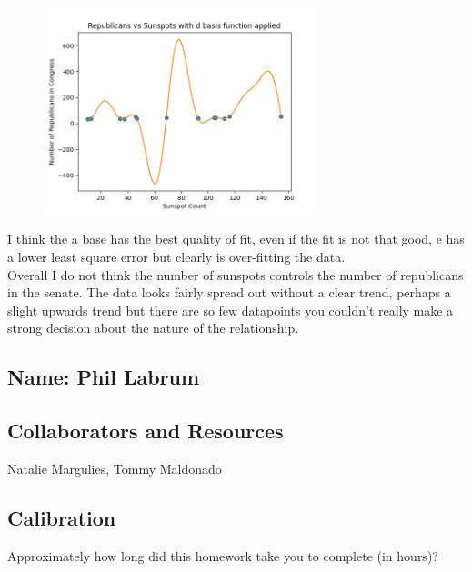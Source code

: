 \documentclass[submit]{harvardml}
\begin{document}
\begin{enumerate}
\begin{enumerate}
\begin{figure}[H]
            \includegraphics[width=8cm]{hw1/T1P4_plots/plot7.png}
            \centering
        \end{figure}
    \end{enumerate}
I think the a base has the best quality of fit, even if the fit is not that good, e has a lower least square error but clearly is over-fitting the data. \\
Overall I do not think the number of sunspots controls the number of republicans in the senate. The data looks fairly spread out without a clear trend, perhaps a slight upwards trend but there are so few datapoints you couldn't really make a strong decision about the nature of the relationship.
\end{enumerate}

\newpage
\subsection*{Name: Phil Labrum}

\subsection*{Collaborators and Resources}
Natalie Margulies, Tommy Maldonado

\subsection*{Calibration}
Approximately how long did this homework take you to complete (in hours)? 
\end{document}
